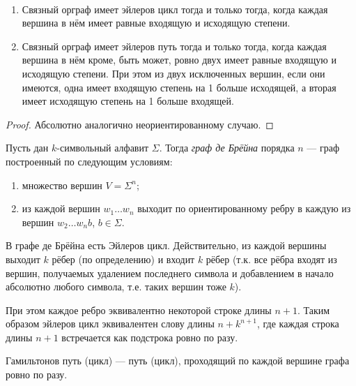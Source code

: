 \documentclass[12pt,a4paper]{article}
\begin{document}
    \begin{theorem}\ 
        \begin{enumerate}
            \item Связный орграф имеет эйлеров цикл тогда и только тогда, когда каждая вершина в нём имеет равные входящую и исходящую степени.
            \item Связный орграф имеет эйлеров путь тогда и только тогда, когда каждая вершина в нём кроме, быть может, ровно двух имеет равные входящую и исходящую степени. При этом из двух исключенных вершин, если они имеются, одна имеет входящую степень на 1 больше исходящей, а вторая имеет исходящую степень на 1 больше входящей.
        \end{enumerate}
    \end{theorem}

    \begin{proof}
        Абсолютно аналогично неориентированному случаю.
    \end{proof}

    \begin{definition}
        Пусть дан $k$-символьный алфавит $\Sigma$. Тогда \emph{граф де Брёйна} порядка $n$ --- граф построенный по следующим условиям:
        \begin{enumerate}
            \item множество вершин $V = \Sigma^n$;
            \item из каждой вершин $w_1\dots w_n$ выходит по ориентированному ребру в каждую из вершин $w_2\dots w_n b$, $b \in \Sigma$.
        \end{enumerate}
    \end{definition}

    \begin{remark}
        В графе де Брёйна есть Эйлеров цикл. Действительно, из каждой вершины выходит $k$ рёбер (по определению) и входит $k$ рёбер (т.к. все рёбра входят из вершин, получаемых удалением последнего символа и добавлением в начало абсолютно любого символа, т.е. таких вершин тоже $k$).

        При этом каждое ребро эквивалентно некоторой строке длины $n+1$. Таким образом эйлеров цикл эквивалентен слову длины $n + k^{n+1}$, где каждая строка длины $n+1$ встречается как подстрока ровно по разу.
    \end{remark}

    \begin{definition}
        Гамильтонов путь (цикл) --- путь (цикл), проходящий по каждой вершине графа ровно по разу.
    \end{definition}
\end{document}
